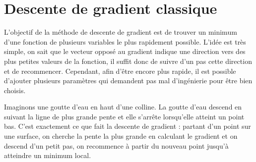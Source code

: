 %
%
%
%
%
%




\section{Descente de gradient classique}
L'objectif de la méthode de descente de gradient est de trouver un minimum d'une fonction de plusieurs variables le plus rapidement possible. L'idée est très simple, on sait que le vecteur opposé au gradient indique une direction vers des plus petites valeurs de la fonction, il suffit donc de suivre d'un pas cette direction et de recommencer. Cependant, afin d'être encore plus rapide, il est possible d'ajouter plusieurs paramètres qui demandent pas mal d'ingénierie pour être bien choisis.

Imaginons une goutte d'eau en haut d'une colline. La goutte d'eau descend en suivant la ligne de plus grande pente et elle s’arrête lorsqu'elle atteint un point bas. C'est exactement ce que fait la descente de gradient : partant d'un point sur une surface, on cherche la pente la plus grande en calculant le gradient et on descend d'un petit pas, on recommence à partir du nouveau point jusqu'à atteindre un minimum local.

